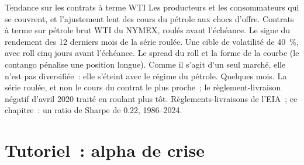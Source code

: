 \begin{strategyfile}{Tendance sur les contrats à terme WTI}\label{strat:s1:trend-following:wti}
 Les producteurs et les consommateurs qui se couvrent, et l'ajustement lent des cours du pétrole aux chocs d'offre.
 Contrats à terme sur pétrole brut WTI du NYMEX, roulés avant l'échéance.
 Le signe du rendement des 12 derniers mois de la série roulée.
 Une cible de volatilité de 40~\%, avec roll cinq jours avant l'échéance.
 Le spread du roll et la forme de la courbe (le contango pénalise une position longue).
 Comme il s'agit d'un seul marché, elle n'est pas diversifiée~: elle s'éteint avec le régime du pétrole.
 Quelques mois.
 La série roulée, et non le cours du contrat le plus proche~; le règlement-livraison négatif d'avril 2020 traité en roulant plus tôt.
 Règlements-livraisons de l'EIA~; ce chapitre~: un ratio de Sharpe de 0.22, 1986--2024.
\end{strategyfile}

\section{Tutoriel~: alpha de crise}\label{tut:s1:trend-following:tut}

